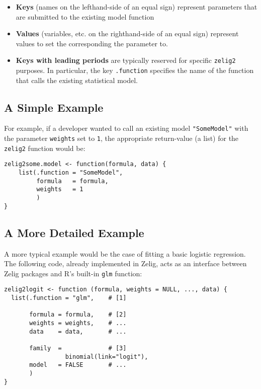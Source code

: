 \documentclass{article}
\newcommand{\code}[1]{{\tt #1}}
\begin{document}
\begin{itemize}

  \item {\bf Keys} (names on the lefthand-side of an equal sign) represent
        parameters that are submitted to the existing model function

  \item {\bf Values} (variables, etc. on the righthand-side of an equal sign)
        represent values to set the corresponding the parameter to.
        
  \item {\bf Keys with leading periods} are typically reserved for specific
        \code{zelig2} purposes. In particular, the key \code{.function}
        specifies the name of the function that calls the existing statistical
        model.

\end{itemize}

\subsection{A Simple Example}

\noindent For example, if a developer wanted to call an existing model
\code{"SomeModel"} with the parameter \code{weights} set to \code{1},
the appropriate return-value (a list) for the \code{zelig2} function would be:


\begin{verbatim}
zelig2some.model <- function(formula, data) {
    list(.function = "SomeModel",
         formula   = formula,
         weights   = 1
         )
}
\end{verbatim}


\subsection{A More Detailed Example}

\noindent A more typical example would be the case of fitting a basic logistic
regression. The following code, already implemented in Zelig, acts as an
interface between Zelig packages and R's built-in \code{glm} function:


\begin{verbatim}
zelig2logit <- function (formula, weights = NULL, ..., data) {
  list(.function = "glm",    # [1]
       
       formula = formula,    # [2]
       weights = weights,    # ...
       data    = data,       # ...

       family  =             # [3]
                 binomial(link="logit"),
       model   = FALSE       # ...
       )
}
\end{verbatim}
\end{document}

